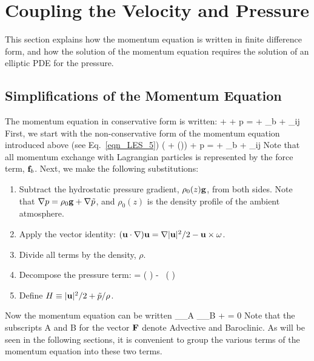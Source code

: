 \section{Coupling the Velocity and Pressure}

This section explains how the momentum equation is written in finite difference form, and how the solution of the momentum equation requires the solution of an elliptic PDE for the pressure.

\subsection{Simplifications of the Momentum Equation}

The momentum equation in conservative form is written:
\be
    + \nabla \cdot \rho \bu \bu + \nabla p = \rho \bg + \bof_b + \nabla\!\cdot \btau_{ij}  \label{con_momentum}
\ee
First, we start with the non-conservative form of the momentum equation introduced above (see Eq.~\ref{eqn_LES_5})
\be
   \rho \left(  + (\bu \cdot \nabla)\bu  \right) + \nabla p = \rho \bg + \bof_b + \nabla\!\cdot \btau_{ij}  \label{momentum}
\ee
Note that all momentum exchange with Lagrangian particles is represented by the force term, ${\mathbf{f}}_b$. Next, we make the following substitutions:
\begin{enumerate}
\item Subtract the hydrostatic pressure gradient, $\rho_0(z) {\mathbf{g}}$, from both sides. Note that $\nabla p=\rho_0 {\mathbf{g}} + \nabla \tilde{p}$, and $\rho_0(z)$ is the density profile of the ambient atmosphere.
\item Apply the vector identity: $({\mathbf{u}} \cdot \nabla) {\mathbf{u}} = \nabla|{\mathbf{u}}|^2/2 - {\mathbf{u}}\times{\mathbf{\omega}}$.
\item Divide all terms by the density, $\rho$.
\item Decompose the pressure term:
   \be {} \nabla \tp = \nabla \left( \frac{\tp}{\rho}\right) - \tp \, \nabla \left( \right)  \label{p_decomp} \ee
\item Define $H \equiv |{\mathbf{u}}|^2/2 + \tilde{p}/\rho$.
\end{enumerate}
Now the momentum equation can be written
\be
    _{\bF_{\rm A}}  _{\bF_{\rm B}} + \nabla \cH =  0 \label{momeq}
\ee
Note that the subscripts A and B for the vector ${\mathbf{F}}$ denote Advective and Baroclinic. As will be seen in the following sections, it is convenient to group the various terms of the momentum equation into these two terms.

